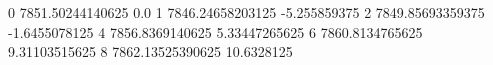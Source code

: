 0 7851.50244140625 0.0
1 7846.24658203125 -5.255859375
2 7849.85693359375 -1.6455078125
4 7856.8369140625 5.33447265625
6 7860.8134765625 9.31103515625
8 7862.13525390625 10.6328125

